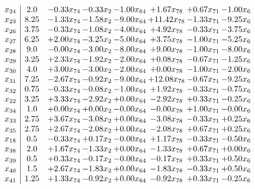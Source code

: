 \documentclass[8pt]{article}
\begin{document}
\[\begin{array}{c| c c@{\hskip 2pt} c@{\hskip 2pt} c@{\hskip 2pt} c@{\hskip 2pt} c@{\hskip 2pt} c@{\hskip 2pt} }
 x_{24}   &  2.0 & -0.33 x_{74} & -0.33 x_{2} & -1.00 x_{64} & +  1.67 x_{78} & +  0.67 x_{71} & -1.00 x_{6}\\
 x_{23}   &  8.25 & -1.33 x_{74} & -1.58 x_{2} & -9.00 x_{64} & + 11.42 x_{78} & -1.33 x_{71} & -9.25 x_{6}\\
 x_{26}   &  3.75 & -0.33 x_{74} & -1.08 x_{2} & -4.00 x_{64} & +  4.92 x_{78} & -0.33 x_{71} & -3.75 x_{6}\\
 x_{27}   &  6.25 & +  2.00 x_{74} & -3.25 x_{2} & -5.00 x_{64} & +  3.75 x_{78} & -1.00 x_{71} & -5.25 x_{6}\\
 x_{28}   &  9.0 & -0.00 x_{74} & -3.00 x_{2} & -8.00 x_{64} & +  9.00 x_{78} & -1.00 x_{71} & -8.00 x_{6}\\
 x_{29}   &  3.25 & +  2.33 x_{74} & -1.92 x_{2} & -2.00 x_{64} & +  0.08 x_{78} & -0.67 x_{71} & -1.25 x_{6}\\
 x_{30}   &  4.0 & +  3.00 x_{74} & -3.00 x_{2} & -2.00 x_{64} & +  0.00 x_{78} & -1.00 x_{71} & -2.00 x_{6}\\
 x_{31}   &  7.25 & -2.67 x_{74} & -0.92 x_{2} & -9.00 x_{64} & + 12.08 x_{78} & -0.67 x_{71} & -9.25 x_{6}\\
 x_{32}   &  0.75 & -0.33 x_{74} & -0.08 x_{2} & -1.00 x_{64} & +  1.92 x_{78} & -0.33 x_{71} & -0.75 x_{6}\\
 x_{22}   &  3.25 & +  3.33 x_{74} & -2.92 x_{2} & +  0.00 x_{64} & -2.92 x_{78} & +  0.33 x_{71} & -0.25 x_{6}\\
 x_{34}   &  1.0 & +  0.00 x_{74} & +  0.00 x_{2} & -0.00 x_{64} & -0.00 x_{78} & +  1.00 x_{71} & -0.00 x_{6}\\
 x_{33}   &  2.75 & +  3.67 x_{74} & -3.08 x_{2} & +  0.00 x_{64} & -3.08 x_{78} & -0.33 x_{71} & +  0.25 x_{6}\\
 x_{35}   &  2.75 & +  2.67 x_{74} & -2.08 x_{2} & +  0.00 x_{64} & -2.08 x_{78} & +  0.67 x_{71} & +  0.25 x_{6}\\
 x_{18}   &  0.5 & -0.33 x_{74} & +  0.17 x_{2} & -0.00 x_{64} & +  1.17 x_{78} & -0.33 x_{71} & -0.50 x_{6}\\
 x_{38}   &  2.0 & +  1.67 x_{74} & -1.33 x_{2} & +  0.00 x_{64} & -1.33 x_{78} & +  0.67 x_{71} & +  0.00 x_{6}\\
 x_{39}   &  0.5 & +  0.33 x_{74} & -0.17 x_{2} & -0.00 x_{64} & -0.17 x_{78} & +  0.33 x_{71} & +  0.50 x_{6}\\
 x_{40}   &  1.5 & +  2.67 x_{74} & -1.83 x_{2} & +  0.00 x_{64} & -1.83 x_{78} & -0.33 x_{71} & +  0.50 x_{6}\\
 x_{41}   &  1.25 & +  1.33 x_{74} & -0.92 x_{2} & +  0.00 x_{64} & -0.92 x_{78} & +  0.33 x_{71} & -0.25 x_{6}\\

\end{array}\]
\end{document}
